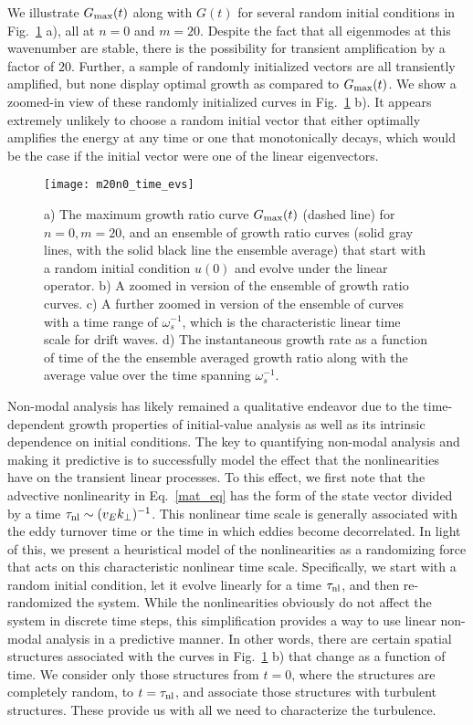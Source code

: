\documentclass[showpacs,preprintnumbers,amsmath,amssymb,superscriptaddress,aip]{revtex4-1}
\begin{document}
We illustrate $G_{\rm{max}}(t)$ along with $G(t)$ for several random initial conditions in Fig.~\ref{m20n0_time_evs} a), all at $n=0$ and $m=20$. Despite the fact that all eigenmodes at this
wavenumber are stable, there is the possibility for transient amplification by a factor of $20$. Further, a sample of randomly initialized vectors are all transiently amplified, but none display
optimal growth as compared to $G_{\rm{max}}(t)$. We show a zoomed-in view of these randomly initialized curves in Fig.~\ref{m20n0_time_evs} b).
It appears extremely unlikely to choose a random initial vector that either optimally amplifies the energy at any time or one that monotonically decays, which would be the case
if the initial vector were one of the linear eigenvectors. 

\begin{figure}
\centerline{\texttt{[image: m20n0\_time\_evs]}}
\caption{a) The maximum growth ratio curve $G_{\rm{max}}(t)$ (dashed line) for $n=0,m=20$, and an ensemble of growth ratio curves (solid gray lines, with the solid black line the ensemble average)
that start with a random initial condition $u(0)$ and evolve under the linear operator. b) A zoomed in version of the ensemble of growth ratio curves. c) A further zoomed in version of the ensemble of
curves with a time range of $\omega_s^{-1}$, which is the characteristic linear time scale for drift waves. 
d) The instantaneous growth rate as a function of time of the the ensemble averaged growth ratio along with the average value over the time spanning $\omega_s^{-1}$.}
\label{m20n0_time_evs}
\end{figure}

Non-modal analysis has likely remained a qualitative endeavor due to the time-dependent growth properties of initial-value analysis as well as its intrinsic dependence on initial conditions.
The key to quantifying non-modal analysis and making it predictive is to successfully model the effect that the nonlinearities have on the transient linear processes. 
To this effect, we first note that the advective nonlinearity in Eq.~\ref{mat_eq} has the form of the state vector divided by a time $\tau_{\rm{nl}} \sim (v_E k_\perp)^{-1}$. This nonlinear
time scale is generally associated with the eddy turnover time or the time in which eddies become decorrelated. In light of this, we present a heuristical model of the nonlinearities 
as a randomizing force that acts on this characteristic nonlinear time scale.
Specifically, we start with a random initial condition, let it evolve linearly for a time $\tau_{\rm{nl}}$, and then re-randomized the system.
While the nonlinearities obviously do not affect the system in discrete time steps, this simplification provides a way to use linear non-modal analysis in a predictive manner.
In other words, there are certain spatial structures associated with the curves in Fig.~\ref{m20n0_time_evs} b) that change as a function of time. We consider only those structures from $t=0$, where
the structures are completely random, to $t = \tau_{\rm{nl}}$, and associate those structures with turbulent structures. These provide us with all we need to characterize the turbulence.
\end{document}
